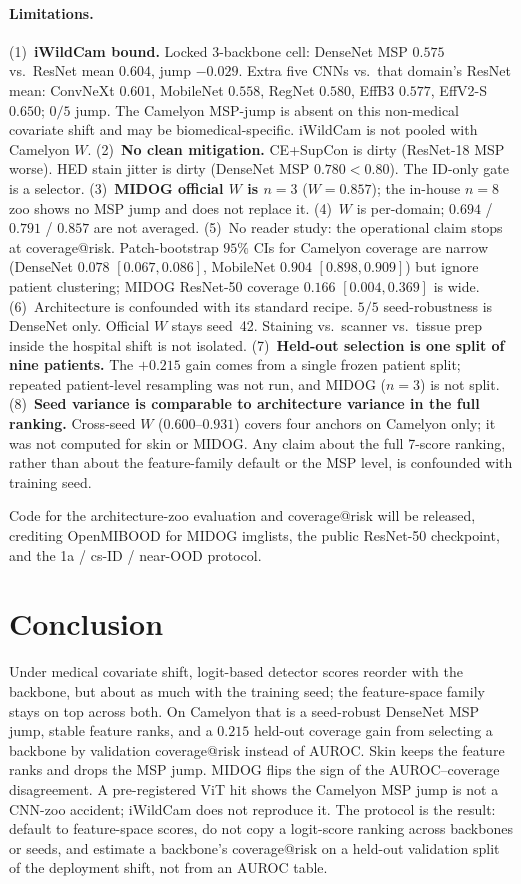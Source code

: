 \documentclass[anon]{midl}
\begin{document}
\paragraph{Limitations.}
(1)~\textbf{iWildCam bound.}
Locked 3-backbone cell: DenseNet MSP $0.575$ vs.\ ResNet mean $0.604$, jump $-0.029$.
Extra five CNNs vs.\ that domain's ResNet mean: ConvNeXt $0.601$, MobileNet $0.558$, RegNet $0.580$, EffB3 $0.577$, EffV2-S $0.650$; $0/5$ jump.
The Camelyon MSP-jump is absent on this non-medical covariate shift and may be biomedical-specific.
iWildCam is not pooled with Camelyon $W$.
(2)~\textbf{No clean mitigation.}
CE{+}SupCon is dirty (ResNet-18 MSP worse).
HED stain jitter is dirty (DenseNet MSP $0.780{<}0.80$).
The ID-only gate is a selector.
(3)~\textbf{MIDOG official $W$ is $n{=}3$} ($W{=}0.857$); the in-house $n{=}8$ zoo shows no MSP jump and does not replace it.
(4)~$W$ is per-domain; $0.694$ / $0.791$ / $0.857$ are not averaged.
(5)~No reader study: the operational claim stops at coverage@risk.
Patch-bootstrap $95\%$ CIs for Camelyon coverage are narrow (DenseNet $0.078$ $[0.067, 0.086]$, MobileNet $0.904$ $[0.898, 0.909]$) but ignore patient clustering; MIDOG ResNet-50 coverage $0.166$ $[0.004, 0.369]$ is wide.
(6)~Architecture is confounded with its standard recipe.
$5/5$ seed-robustness is DenseNet only.
Official $W$ stays seed~42.
Staining vs.\ scanner vs.\ tissue prep inside the hospital shift is not isolated.
(7)~\textbf{Held-out selection is one split of nine patients.}
The $+0.215$ gain comes from a single frozen patient split; repeated patient-level resampling was not run, and MIDOG ($n{=}3$) is not split.
(8)~\textbf{Seed variance is comparable to architecture variance in the full ranking.}
Cross-seed $W$ ($0.600$--$0.931$) covers four anchors on Camelyon only; it was not computed for skin or MIDOG.
Any claim about the full 7-score ranking, rather than about the feature-family default or the MSP level, is confounded with training seed.

Code for the architecture-zoo evaluation and coverage@risk will be released, crediting OpenMIBOOD for MIDOG imglists, the public ResNet-50 checkpoint, and the 1a / cs-ID / near-OOD protocol.

\section{Conclusion}

Under medical covariate shift, logit-based detector scores reorder with the backbone, but about as much with the training seed; the feature-space family stays on top across both.
On Camelyon that is a seed-robust DenseNet MSP jump, stable feature ranks, and a $0.215$ held-out coverage gain from selecting a backbone by validation coverage@risk instead of AUROC.
Skin keeps the feature ranks and drops the MSP jump.
MIDOG flips the sign of the AUROC--coverage disagreement.
A pre-registered ViT hit shows the Camelyon MSP jump is not a CNN-zoo accident; iWildCam does not reproduce it.
The protocol is the result: default to feature-space scores, do not copy a logit-score ranking across backbones or seeds, and estimate a backbone's coverage@risk on a held-out validation split of the deployment shift, not from an AUROC table.
\end{document}
